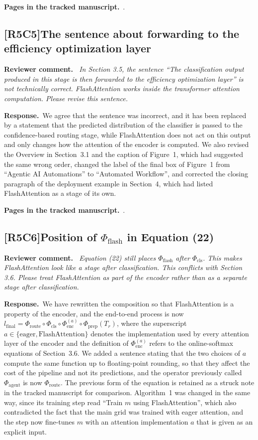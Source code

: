 \documentclass[11pt,a4paper]{article}
\newcommand{\comment}[3]{\subsection*{\textcolor{#1}{[#2]}\enspace #3}}
\newenvironment{reviewercomment}{\par\noindent\textbf{Reviewer comment.}\itshape\ }{\par}
\newcommand{\response}{\par\noindent\textbf{Response.}\ }
\newcommand{\where}[1]{\par\noindent\textbf{Pages in the tracked manuscript.}\ \rvpages[M-]{#1}.}
\begin{document}
\where{R5C4}

\comment{rvFive}{R5C5}{The sentence about forwarding to the efficiency optimization layer}
\begin{reviewercomment}
In Section 3.5, the sentence ``The classification output produced in this stage is then forwarded to the efficiency optimization layer'' is not technically correct. FlashAttention works inside the transformer attention computation. Please revise this sentence.
\end{reviewercomment}
\response We agree that the sentence was incorrect, and it has been replaced by a statement that the predicted distribution of the classifier is passed to the confidence-based routing stage, while FlashAttention does not act on this output and only changes how the attention of the encoder is computed. We also revised the Overview in Section~3.1 and the caption of Figure~1, which had suggested the same wrong order, changed the label of the final box of Figure~1 from ``Agentic AI Automations'' to ``Automated Workflow'', and corrected the closing paragraph of the deployment example in Section~4, which had listed FlashAttention as a stage of its own.

\where{R5C5}

\comment{rvFive}{R5C6}{Position of $\Phi_{\mathrm{flash}}$ in Equation (22)}
\begin{reviewercomment}
Equation (22) still places $\Phi_{\mathrm{flash}}$ after $\Phi_{\mathrm{cls}}$. This makes FlashAttention look like a stage after classification. This conflicts with Section 3.6. Please treat FlashAttention as part of the encoder rather than as a separate stage after classification.
\end{reviewercomment}
\response We have rewritten the composition so that FlashAttention is a property of the encoder, and the end-to-end process is now $l_{\mathrm{final}} = \Phi_{\mathrm{route}} \circ \Phi_{\mathrm{cls}} \circ \Phi_{\mathrm{enc}}^{(a)} \circ \Phi_{\mathrm{prep}}(T_r)$, where the superscript $a \in \{\text{eager}, \text{FlashAttention}\}$ denotes the implementation used by every attention layer of the encoder and the definition of $\Phi_{\mathrm{enc}}^{(a)}$ refers to the online-softmax equations of Section~3.6. We added a sentence stating that the two choices of $a$ compute the same function up to floating-point rounding, so that they affect the cost of the pipeline and not its predictions, and the operator previously called $\Phi_{\mathrm{agent}}$ is now $\Phi_{\mathrm{route}}$. The previous form of the equation is retained as a struck note in the tracked manuscript for comparison. Algorithm~1 was changed in the same way, since its training step read ``Train $m$ using FlashAttention'', which also contradicted the fact that the main grid was trained with eager attention, and the step now fine-tunes $m$ with an attention implementation $a$ that is given as an explicit input.
\end{document}
